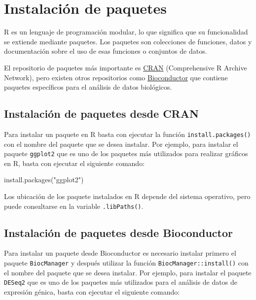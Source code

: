 \documentclass[
  a4paper,
]{scrreport}
\newenvironment{Shaded}{\begin{snugshade}}{\end{snugshade}}
\newcommand{\FunctionTok}[1]{\textcolor[rgb]{0.28,0.35,0.67}{#1}}
\newcommand{\NormalTok}[1]{\textcolor[rgb]{0.00,0.23,0.31}{#1}}
\newcommand{\StringTok}[1]{\textcolor[rgb]{0.13,0.47,0.30}{#1}}
\theoremstyle{definition}
\theoremstyle{remark}
\begin{document}
\section{Instalación de paquetes}\label{instalaciuxf3n-de-paquetes}

R es un lenguaje de programación modular, lo que significa que su
funcionalidad se extiende mediante paquetes. Los paquetes son
colecciones de funciones, datos y documentación sobre el uso de esas
funciones o conjuntos de datos.

El repositorio de paquetes más importante es
\href{https://cran.r-project.org/}{CRAN} (Comprehensive R Archive
Network), pero existen otros repositorios como
\href{https://www.bioconductor.org/}{Bioconductor} que contiene paquetes
específicos para el análisis de datos biológicos.

\subsection{Instalación de paquetes desde
CRAN}\label{instalaciuxf3n-de-paquetes-desde-cran}

Para instalar un paquete en R basta con ejecutar la función
\texttt{install.packages()} con el nombre del paquete que se desea
instalar. Por ejemplo, para instalar el paquete \texttt{ggplot2} que es
uno de los paquetes más utilizados para realizar gráficos en R, basta
con ejecutar el siguiente comando:

\begin{Shaded}
\begin{Highlighting}[]
\FunctionTok{install.packages}\NormalTok{(}\StringTok{"ggplot2"}\NormalTok{)}
\end{Highlighting}
\end{Shaded}

Los ubicación de los paquete instalados en R depende del sistema
operativo, pero puede consultarse en la variable \texttt{.libPaths()}.

\subsection{Instalación de paquetes desde
Bioconductor}\label{instalaciuxf3n-de-paquetes-desde-bioconductor}

Para instalar un paquete desde Bioconductor es necesario instalar
primero el paquete \texttt{BiocManager} y después utilizar la función
\texttt{BiocManager::install()} con el nombre del paquete que se desea
instalar. Por ejemplo, para instalar el paquete \texttt{DESeq2} que es
uno de los paquetes más utilizados para el análisis de datos de
expresión génica, basta con ejecutar el siguiente comando:
\end{document}
